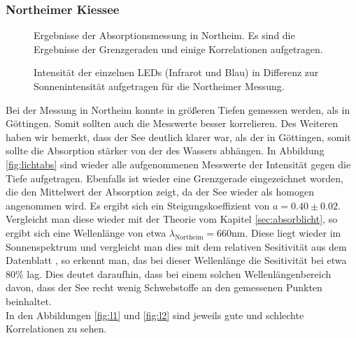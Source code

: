 \documentclass[12pt,a4paper,titlepage,headinclude,bibtotoc]{scrartcl}
\numberwithin{equation}{subsection}
\begin{document}
\subsubsection{Northeimer Kiessee}
\begin{figure}[!h]
	\centering
   \hfill
   \hfill
   \hfill
	\caption{Ergebnisse der Absorptionsmessung in Northeim. Es sind die Ergebnisse der Grenzgeraden und einige Korrelationen aufgetragen.}
	\label{fig:lichtNort}
\end{figure}
\begin{figure}[!htb]
	\centering
	\resizebox{0.7\linewidth}{!}{}
	\caption{Intensität der einzelnen LEDs (Infrarot und Blau) in Differenz zur Sonnenintensität aufgetragen für die Northeimer Messung.}
	\label{fig:led}
\end{figure}
Bei der Messung in Northeim konnte in größeren Tiefen gemessen werden, als in Göttingen.
Somit sollten auch die Messwerte besser korrelieren.
Des Weiteren haben wir bemerkt, dass der See deutlich klarer war, als der in Göttingen, somit sollte die Absorption stärker von der des Wassers abhängen.
In Abbildung \ref{fig:lichtabs} sind wieder alle aufgenommenen Messwerte der Intensität gegen die Tiefe aufgetragen.
Ebenfalls ist wieder eine Grenzgerade eingezeichnet worden, die den Mittelwert der Absorption zeigt, da der See wieder als homogen angenommen wird.
Es ergibt sich ein Steigungskoeffizient von $a=0.40\pm0.02$.
Vergleicht man diese wieder mit der Theorie vom Kapitel \ref{sec:absorblicht}, so ergibt sich eine Wellenlänge von etwa $\lambda_\text{Northeim}=660\si{\nano\meter}$.
Diese liegt wieder im Sonnenspektrum und vergleicht man dies mit dem relativen Sesitivität aus dem Datenblatt \cite[20]{PHOTODatenblatt}, so erkennt man, das bei dieser Wellenlänge die Sesitivität bei etwa 80\% lag.
Dies deutet daraufhin, dass bei einem solchen Wellenlängenbereich davon, dass der See recht wenig Schwebstoffe an den gemessenen Punkten beinhaltet.\\
In den Abbildungen \ref{fig:l1} und \ref{fig:l2} sind jeweils gute und schlechte Korrelationen zu sehen.
\end{document}
